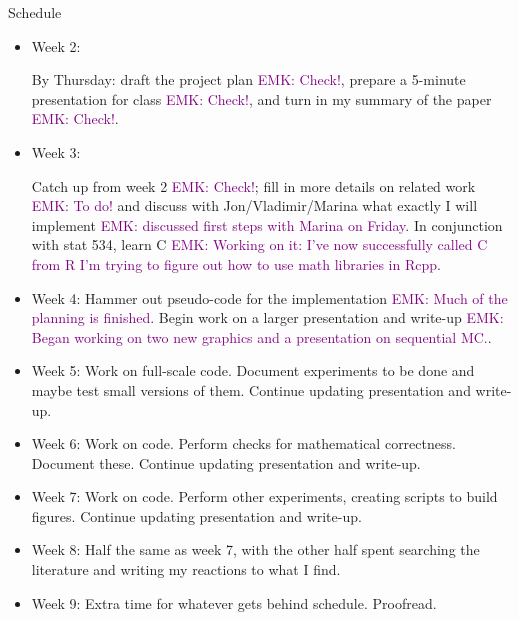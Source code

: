 \documentclass{article}
\newcommand\EMK[1]{\textcolor{purple}{EMK: #1}}
\begin{document}
Schedule 
\begin{itemize}
\item Week 2:

By Thursday: draft the project plan \EMK{Check!}, prepare a 5-minute presentation for class \EMK{Check!}, and turn in my summary of the paper \EMK{Check!}.


\item Week 3:

Catch up from week 2 \EMK{Check!}; fill in more details on related work \EMK{To do!} and discuss with Jon/Vladimir/Marina what exactly I will implement \EMK{discussed first steps with Marina on Friday}. In conjunction with stat 534, learn C \EMK{Working on it: I've now successfully called C from R I'm trying to figure out how to use math libraries in Rcpp}.

\item Week 4: Hammer out pseudo-code for the implementation \EMK{Much of the planning is finished}. Begin work on a larger presentation and write-up \EMK{Began working on two new graphics and a presentation on sequential MC.}.

\item Week 5: Work on full-scale code. Document experiments to be done and maybe test small versions of them. Continue updating presentation and write-up.

\item Week 6: Work on code. Perform checks for mathematical correctness. Document these. Continue updating presentation and write-up. 

\item Week 7: Work on code. Perform other experiments, creating scripts to build figures. Continue updating presentation and write-up.

\item Week 8: Half the same as week 7, with the other half spent searching the literature and writing my reactions to what I find.

\item Week 9: Extra time for whatever gets behind schedule. Proofread. 
\end{itemize}



%





\end{document}
